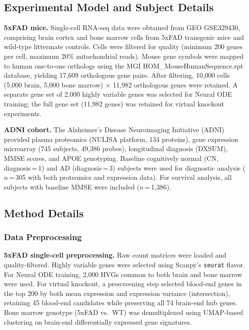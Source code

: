 \documentclass[12pt,a4paper]{article}
\begin{document}
\subsection*{Experimental Model and Subject Details}

\textbf{5xFAD mice.} Single-cell RNA-seq data were obtained from GEO GSE329430, comprising brain cortex and bone marrow cells from 5xFAD transgenic mice and wild-type littermate controls. Cells were filtered for quality (minimum 200 genes per cell, maximum 20\% mitochondrial reads). Mouse gene symbols were mapped to human one-to-one orthologs using the MGI HOM\_MouseHumanSequence.rpt database, yielding 17{,}609 orthologous gene pairs. After filtering, 10{,}000 cells (5{,}000 brain, 5{,}000 bone marrow) $\times$ 11{,}982 orthologous genes were retained. A separate gene set of 2{,}000 highly variable genes was selected for Neural ODE training; the full gene set (11{,}982 genes) was retained for virtual knockout experiments.

\textbf{ADNI cohort.} The Alzheimer's Disease Neuroimaging Initiative (ADNI) provided plasma proteomics (NULISA platform, 134 proteins), gene expression microarray (745 subjects, 49{,}386 probes), longitudinal diagnosis (DXSUM), MMSE scores, and APOE genotyping. Baseline cognitively normal (CN, diagnosis\,=\,1) and AD (diagnosis\,=\,3) subjects were used for diagnostic analysis ($n$\,=\,305 with both proteomics and expression data). For survival analysis, all subjects with baseline MMSE were included ($n$\,=\,1{,}386).

\subsection*{Method Details}

\subsubsection{Data Preprocessing}

\textbf{5xFAD single-cell preprocessing.} Raw count matrices were loaded and quality-filtered. Highly variable genes were selected using Scanpy's \texttt{seurat} flavor. For Neural ODE training, 2{,}000 HVGs common to both brain and bone marrow were used. For virtual knockout, a prescreening step selected blood-end genes in the top 200 by both mean expression and expression variance (intersection), retaining 45 blood-end candidates while preserving all 74 brain-end hub genes. Bone marrow genotype (5xFAD vs.\ WT) was demultiplexed using UMAP-based clustering on brain-end differentially expressed gene signatures.
\end{document}
